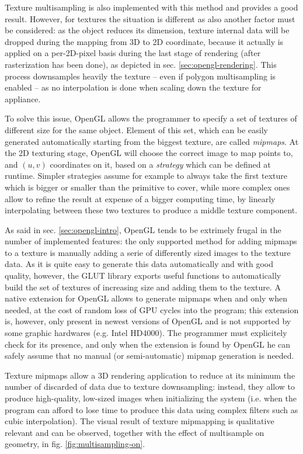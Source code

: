 Texture multisampling is also implemented with this method and provides a good
result. However, for textures the situation is different as also another factor
must be considered: as the object reduces
its dimension, texture internal data will be dropped during the mapping from 3D
to 2D coordinate, because it actually is applied on a per-2D-pixel basis during the
last stage of rendering (after rasterization has been done), as depicted in sec.
\ref{sec:opengl-rendering}. This process downsamples heavily the texture -- even if
polygon multisampling is enabled -- as no interpolation is done when scaling
down the texture for appliance.

To solve this issue, OpenGL allows the programmer to specify a set of textures
of different size for the same object. Element of this set, which can be easily
generated automatically starting from the biggest texture, are called
\emph{mipmaps}. At the 2D texturing stage, OpenGL will choose the correct image
to map points to, and $(u,v)$ coordinates on it, based on a \emph{strategy}
which can be defined at runtime. Simpler strategies assume for example to always
take the first texture which is bigger or smaller than the primitive to cover,
while more complex ones allow to refine the result at expense of a bigger
computing time, by linearly interpolating between these two textures to produce
a middle texture component.

As said in sec. \ref{sec:opengl-intro}, OpenGL tends to be extrimely frugal in the
number of implemented features: the only supported method for adding mipmaps to
a texture is manually adding a serie of differently sized images to the texture
data. As it is quite easy to generate this data automatically and with good
quality, however, the GLUT library exports useful functions to automatically
build the set of textures of increasing size and adding them to the texture.
A native extension for OpenGL allows to generate mipmaps when and only when
needed, at the cost of random loss of GPU cycles into the program; this extension is,
however, only present in newest versions of OpenGL and is not supported by some
graphic hardwares (e.g. Intel HD4000). The programmer must explicitely check for
its presence, and only when the extension is found by OpenGL he can safely
assume that no manual (or semi-automatic) mipmap generation is needed.

Texture mipmaps allow a 3D rendering application to reduce at its minimum the
number of discarded of data due to texture downsampling: instead, they allow to
produce high-quality, low-sized images when initializing the system (i.e. when
the program can afford to lose time to produce this data using complex filters
such as cubic interpolation). The visual result of texture mipmapping is
qualitative relevant and can be observed, together with the effect of
multisample on geometry, in fig. \ref{fig:multisampling-on}.

